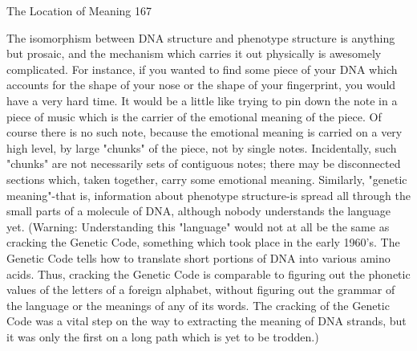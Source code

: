The Location of Meaning                                                                 167

The isomorphism between DNA structure and phenotype structure is anything but
prosaic, and the mechanism which carries it out physically is awesomely complicated.
For instance, if you wanted to find some piece of your DNA which accounts for the shape
of your nose or the shape of your fingerprint, you would have a very hard time. It would
be a little like trying to pin down the note in a piece of music which is the carrier of the
emotional meaning of the piece. Of course there is no such note, because the emotional
meaning is carried on a very high level, by large "chunks" of the piece, not by single
notes. Incidentally, such "chunks" are not necessarily sets of contiguous notes; there may
be disconnected sections which, taken together, carry some emotional meaning.
         Similarly, "genetic meaning"-that is, information about phenotype structure-is
spread all through the small parts of a molecule of DNA, although nobody understands
the language yet. (Warning: Understanding this "language" would not at all be the same
as cracking the Genetic Code, something which took place in the early 1960's. The
Genetic Code tells how to translate short portions of DNA into various amino acids.
Thus, cracking the Genetic Code is comparable to figuring out the phonetic values of the
letters of a foreign alphabet, without figuring out the grammar of the language or the
meanings of any of its words. The cracking of the Genetic Code was a vital step on the
way to extracting the meaning of DNA strands, but it was only the first on a long path
which is yet to be trodden.)


